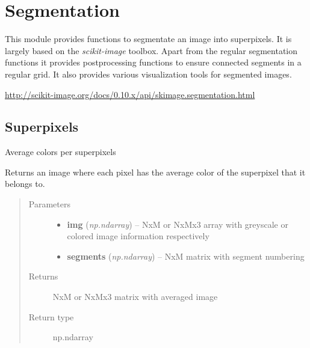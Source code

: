 \documentclass[letterpaper,10pt,english]{sphinxmanual}
\begin{document}
\section{Segmentation}
\label{segmentation:segmentation}\label{segmentation::doc}
This module provides functions to segmentate an image into
superpixels. It is largely based on the \emph{scikit-image} toolbox.
Apart from the regular segmentation functions it provides
postprocessing functions to ensure connected segments in a regular
grid. It also provides various visualization tools for segmented
images.




\href{http://scikit-image.org/docs/0.10.x/api/skimage.segmentation.html}{http://scikit-image.org/docs/0.10.x/api/skimage.segmentation.html}




\subsection{Superpixels}
\label{segmentation:superpixels}\label{segmentation:module-flamingo.segmentation.superpixels}

\begin{fulllineitems}
\label{segmentation:flamingo.segmentation.superpixels.average_colors}
Average colors per superpixels

Returns an image where each pixel has the average color of the
superpixel that it belongs to.
\begin{quote}\begin{description}
\item[{Parameters}] \leavevmode\begin{itemize}
\item {} 
\textbf{img} (\emph{np.ndarray}) -- NxM or NxMx3 array with greyscale or colored image information
respectively

\item {} 
\textbf{segments} (\emph{np.ndarray}) -- NxM matrix with segment numbering

\end{itemize}

\item[{Returns}] \leavevmode
NxM or NxMx3 matrix with averaged image

\item[{Return type}] \leavevmode
np.ndarray

\end{description}\end{quote}

\end{fulllineitems}
\end{document}

